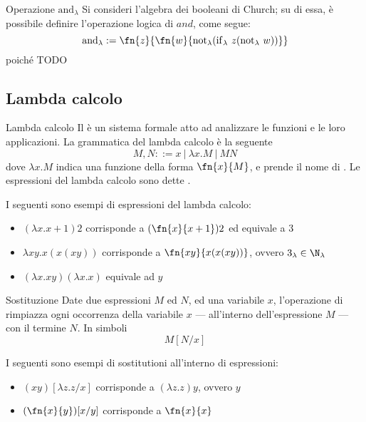 \documentclass[a4paper, 12pt]{report}
\begin{document}
    \begin{framedobs}{Operazione $\mathrm{and}_\lambda$}
        Si consideri l'algebra dei booleani di Church; su di essa, è possibile definire l'operazione logica di $and$, come segue: $$\mathrm{and}_\lambda := \fn{z}{\fn{w}{\mathrm{not}_\lambda(\mathrm{if}_\lambda \ z (\mathrm{not}_\lambda \ w))}}$$ poiché TODO
    \end{framedobs}

    \subsection{Lambda calcolo}

    \begin{frameddefn}{Lambda calcolo}
        Il  è un sistema formale atto ad analizzare le funzioni e le loro applicazioni. La grammatica del lambda calcolo è la seguente $$M,N ::= x \ | \ \lambda x . M \ | \ MN$$ dove $\lambda x.M$ indica una funzione della forma $\fn{x}{M}$, e prende il nome di . Le espressioni del lambda calcolo sono dette .
    \end{frameddefn}

    \begin{example}
        I seguenti sono esempi di espressioni del lambda calcolo:

        \begin{itemize}
            \item $(\lambda x.x +1)2$ corrisponde a $(\fn{x}{x+1})2$ ed equivale a 3
            \item $\lambda xy.x(x(xy))$ corrisponde a $\fn{xy}{x(x(xy))}$, ovvero $3_\lambda \in \N_\lambda$
            \item $(\lambda x.xy)(\lambda x.x)$ equivale ad $y$
        \end{itemize}
    \end{example}

    \begin{frameddefn}[label={sub}]{Sostituzione}
        Date due espressioni $M$ ed $N$, ed una variabile $x$, l'operazione di  rimpiazza ogni occorrenza della variabile $x$ --- all'interno dell'espressione $M$ --- con il termine $N$. In simboli $$M[N/x]$$ 
    \end{frameddefn}

    \begin{example}[Sostituzioni]
        I seguenti sono esempi di sostitutioni all'interno di espressioni:

        \begin{itemize}
            \item $(xy)[\lambda z.z/x]$ corrisponde a $(\lambda z.z)y$, ovvero $y$
            \item $(\fn{x}{y})[x/y]$ corrisponde a $\fn{x}{x}$
        \end{itemize}
    \end{example}
\end{document}
